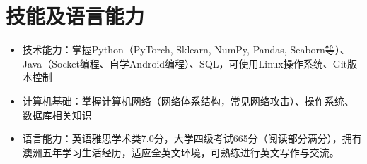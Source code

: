 \documentclass[UTF8,letterpaper,11pt]{article}
\begin{document}

\section{\textbf{技能及语言能力}}

\begin{itemize}
  \setlength\itemsep{2pt}
  \item 技术能力：掌握Python（PyTorch, Sklearn, NumPy, Pandas, Seaborn等）、Java（Socket编程、自学Android编程）、SQL，可使用Linux操作系统、Git版本控制
  \item 计算机基础：掌握计算机网络（网络体系结构，常见网络攻击）、操作系统、数据库相关知识
  \item 语言能力：英语雅思学术类7.0分，大学四级考试665分（阅读部分满分），拥有澳洲五年学习生活经历，适应全英文环境，可熟练进行英文写作与交流。
\end{itemize}

\end{document}
